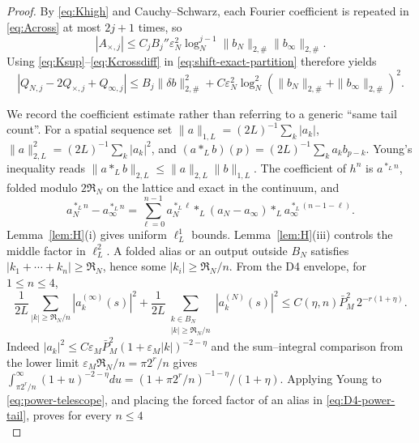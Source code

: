 \documentclass[11pt,a4paper]{article}
\theoremstyle{plain}
\theoremstyle{definition}
\newcommand{\eps}{\varepsilon}
\begin{document}
\begin{proof}
By \eqref{eq:Khigh} and Cauchy--Schwarz, each Fourier coefficient is repeated in
\eqref{eq:Across} at most $2j+1$ times, so
\begin{equation}
 |A_{\times,j}|\le C_jB_j''\eps_N^2\log_N^{j-1}
                  \|b_N\|_{2,\#}\|b_\infty\|_{2,\#}.              \label{eq:Across-bound}
\end{equation}
Using \eqref{eq:Ksup}--\eqref{eq:Kcrossdiff} in
\eqref{eq:shift-exact-partition} therefore yields
\begin{equation}
 |Q_{N,j}-2Q_{\times,j}+Q_{\infty,j}|
 \le B_j\|\delta b\|_{2,\#}^2
 +C\eps_N^2\log_N^2
   (\|b_N\|_{2,\#}+\|b_\infty\|_{2,\#})^2.                         \label{eq:shift-Qbound}
\end{equation}

We record the coefficient estimate rather than referring to a generic ``same tail
count''.  For a spatial sequence set
$\|a\|_{1,L}=(2L)^{-1}\sum_k|a_k|$,
$\|a\|_{2,L}^2=(2L)^{-1}\sum_k|a_k|^2$, and
$(a*_Lb)(p)=(2L)^{-1}\sum_ka_kb_{p-k}$.  Young's inequality reads
$\|a*_Lb\|_{2,L}\le\|a\|_{2,L}\|b\|_{1,L}$.  The coefficient of $h^n$ is
$a^{*_{L}n}$, folded modulo $2\mathfrak R_N$ on the lattice and exact in the
continuum, and
\begin{equation}
 a_N^{*_{L}n}-a_\infty^{*_{L}n}
 =\sum_{\ell=0}^{n-1}a_N^{*_{L}\ell}*_{L}(a_N-a_\infty)
     *_{L}a_\infty^{*_{L}(n-1-\ell)}.                               \label{eq:power-telescope}
\end{equation}
Lemma~\ref{lem:H}(i) gives uniform $\ell^1_L$ bounds.  Lemma~\ref{lem:H}(iii)
controls the middle factor in $\ell^2_L$.  A folded alias or an output outside
$B_N$ satisfies $|k_1+\cdots+k_n|\ge\mathfrak R_N$, hence some
$|k_i|\ge\mathfrak R_N/n$.  From the D4 envelope, for $1\le n\le4$,
\begin{equation}
 \frac1{2L}\sum_{|k|\ge\mathfrak R_N/n}|a_k^{(\infty)}(s)|^2
 +\frac1{2L}\sum_{\substack{k\in B_N\\|k|\ge\mathfrak R_N/n}}
       |a_k^{(N)}(s)|^2
 \le C(\eta,n)\bar P_M^2\,2^{-r(1+\eta)}.                         \label{eq:D4-power-tail}
\end{equation}
Indeed $|a_k|^2\le C\eps_M\bar P_M^2(1+\eps_M|k|)^{-2-\eta}$ and the
sum--integral comparison from the lower limit
$\eps_M\mathfrak R_N/n=\pi2^r/n$ gives
$\int_{\pi2^r/n}^\infty(1+u)^{-2-\eta}du
=(1+\pi2^r/n)^{-1-\eta}/(1+\eta)$.  Applying Young to
\eqref{eq:power-telescope}, and placing the forced factor of an alias in
\eqref{eq:D4-power-tail}, proves for every $n\le4$
\begin{equation}

\end{equation}
\end{proof}
\end{document}
